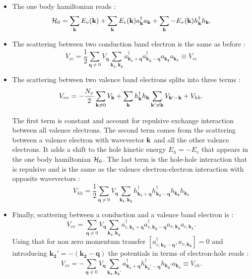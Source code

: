 \begin{itemize}
    \item The one body hamiltonian reads : 
    \begin{equation}
    \mathcal{H}_0 = \sum_{\mathbf{k}}E_v(\mathbf{k})+ \sum_{\mathbf{k}}E_c(\mathbf{k}) a^{\dagger}_{\mathbf{k}}a_{\mathbf{k}} + \sum_{\mathbf{k}}-E_v(\mathbf{k}) h^{\dagger}_{\mathbf{k}}h_{\mathbf{k}}.
    \end{equation}

    \item The scattering between two conduction band electron is the same as before :
    \begin{equation}
    V_{cc} = \dfrac{1}{2}\sum_{\textbf{q}\neq 0}V_{\mathbf{q}} \sum_{\mathbf{k_{1}, k_{2}}} a^{\dagger}_{\mathbf{k_1+q}}a^{\dagger}_{\mathbf{k_2-q}}a_{\mathbf{k_2}}a_{\mathbf{k_1}} \equiv V_{ee}
    \label{eq:cc_interaction}
    \end{equation}

    \item The scattering between two valence band electrons splits into three terms :
    \begin{equation}
    V_{vv}=-\dfrac{N_v}{2}\sum_{\mathbf{k} \neq 0}V_{\mathbf{k}} + \sum_{\mathbf{k}}h^{\dagger}_{\mathbf{k}}h_{\mathbf{k}}\sum_{\mathbf{k}'\neq \mathbf{k}}V_{\mathbf{k}'-\mathbf{k}}+V_{hh}.
    \label{eq:vv_interaction}
    \end{equation}

    The first term is constant and account for repulsive exchange interaction between all valence electrons. The second term comes from the scattering between a valence electron with wavevector $\mathbf{k}$ and all the other valence electrons.
    It adds a shift to the hole kinetic energy $E_h = -E_v$ that appears in the one body hamiltonian $\mathcal{H}_0$. 
     The last term is the hole-hole interaction that is repulsive and is the same as the valence electron-electron interaction with opposite wavevectors : 
    \begin{equation}
    V_{hh} = \dfrac{1}{2}\sum_{\textbf{q}\neq 0}V_{\mathbf{q}} \sum_{\mathbf{k_{1}, k_{2}}} h^{\dagger}_{\mathbf{k_1+q}}h^{\dagger}_{\mathbf{k_2-q}}h_{\mathbf{k_2}}h_{\mathbf{k_1}} 
    \label{eq:hh_interaction}
    \end{equation}

    \item Finally, scattering between a conduction and a valence band electron is :
    \begin{equation}
    \label{eq:cv_interaction_in_cv_picture}
    V_{cv} = \sum_{\textbf{q}\neq 0}V_{\mathbf{q}} \sum_{\mathbf{k_{1}, k_{2}}} a^{\dagger}_{c,\mathbf{k_1+q}}a^{\dagger}_{v,\mathbf{k_2-q}}a_{v,\mathbf{k_2}}a_{c,\mathbf{k_1}}.
    \end{equation}
    Using that for non zero momentum transfer $[a^{\dagger}_{v,\mathbf{k_2-q}}, a_{v,\mathbf{k_2}}] = 0$ and introducing $\mathbf{k_2'} = -(\mathbf{k_2-q})$ the potentials in terms of electron-hole reads :
    \begin{equation}
        V_{cv} = -\sum_{\textbf{q}\neq 0}V_{\mathbf{q}} \sum_{\mathbf{k_{1}, k_{2}'}} a^{\dagger}_{\mathbf{k_1+q}}h^{\dagger}_{\mathbf{k_2'-q}}h_{\mathbf{k_2'}}a_{\mathbf{k_1}} \equiv V_{eh}.
    \label{eq:eh-interaction}
    \end{equation}

\end{itemize}
